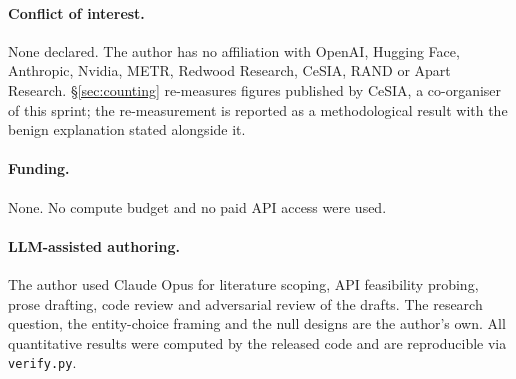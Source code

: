 \documentclass[11pt,a4paper]{article}
\begin{document}
\paragraph{Conflict of interest.} None declared. The author has no affiliation
with OpenAI, Hugging Face, Anthropic, Nvidia, METR, Redwood Research, CeSIA,
RAND or Apart Research. §\ref{sec:counting} re-measures figures published by
CeSIA, a co-organiser of this sprint; the re-measurement is reported as a
methodological result with the benign explanation stated alongside it.

\paragraph{Funding.} None. No compute budget and no paid API access were used.

\paragraph{LLM-assisted authoring.} The author used Claude Opus for literature
scoping, API feasibility probing, prose drafting, code review and adversarial
review of the drafts. The research question, the entity-choice framing and the
null designs are the author's own. All quantitative results were computed by the
released code and are reproducible via \texttt{verify.py}.
\end{document}

